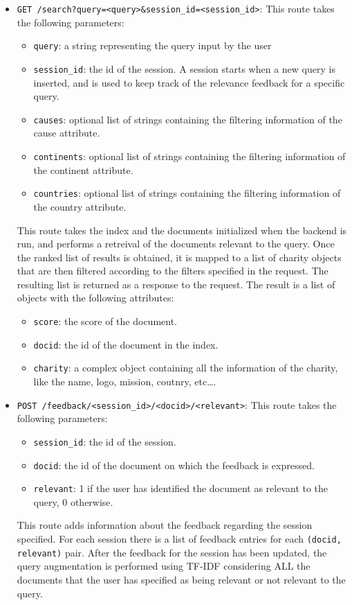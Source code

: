 \documentclass[unicode,9pt,a4paper,oneside,numbers=endperiod,openany]{scrartcl}
\begin{document}
\begin{itemize}
    \item \texttt{GET /search?query=<query>\&session\_id=<session\_id>}: \newline
    This route takes the following parameters:
    \begin{itemize}
        \item \texttt{query}: a string representing the query input by the user
        \item \texttt{session\_id}: the id of the session. A session starts when a new query is inserted, and is used to keep track of the relevance feedback for a specific query.
        \item \texttt{causes}: optional list of strings containing the filtering information of the cause attribute.
        \item \texttt{continents}: optional list of strings containing the filtering information of the continent attribute.
        \item \texttt{countries}: optional list of strings containing the filtering information of the country attribute.
    \end{itemize}
    This route takes the index and the documents initialized when the backend is run, and performs a retreival of the documents relevant to the query. Once the ranked list of results is obtained, it is mapped to a list of charity objects that are then filtered according to the filters specified in the request. The resulting list is returned as a response to the request.
    The result is a list of objects with the following attributes:
    \begin{itemize}
        \item \texttt{score}: the score of the document.
        \item \texttt{docid}: the id of the document in the index.
        \item \texttt{charity}: a complex object containing all the information of the charity, like the name, logo, mission, coutnry, etc\dots .
    \end{itemize}
    \item \texttt{POST /feedback/<session\_id>/<docid>/<relevant>}:\newline
    This route takes the following parameters:
    \begin{itemize}
        \item \texttt{session\_id}: the id of the session.
        \item \texttt{docid}: the id of the document on which the feedback is expressed.
        \item \texttt{relevant}: 1 if the user has identified the document as relevant to the query, 0 otherwise.
    \end{itemize}
    This route adds information about the feedback regarding the session specified. For each session there is a list of feedback entries for each \texttt{(docid, relevant)} pair.
    After the feedback for the session has been updated, the query augmentation is performed using TF-IDF considering ALL the documents that the user has specified as being relevant or not relevant to the query.
\end{itemize}
\end{document}
